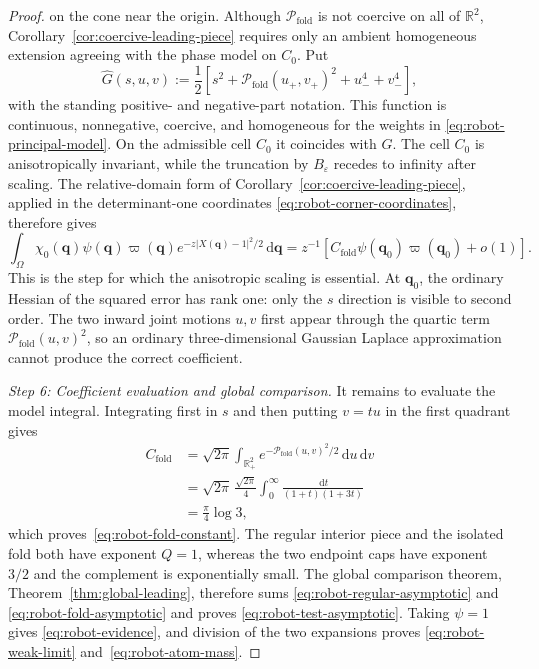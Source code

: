 \documentclass[11pt]{amsart}
\numberwithin{equation}{section}
\theoremstyle{definition}
\theoremstyle{remark}
\newcommand{\R}{\mathbb{R}}
\newcommand{\dd}{\,\mathrm{d}}
\newcommand{\eps}{\varepsilon}
\begin{document}
\begin{proof}
on the cone near the origin.  Although $\mathcal P_{\mathrm{fold}}$ is not coercive on all of $\R^2$,
Corollary~\ref{cor:coercive-leading-piece} requires only an ambient homogeneous
extension agreeing with the phase model on $C_0$.  Put
\begin{equation}\label{eq:robot-extended-model}
 \widehat G(s,u,v):=
 \frac12\left[
 s^2+\mathcal P_{\mathrm{fold}}(u_+,v_+)^2+u_-^4+v_-^4
 \right],
\end{equation}
with the standing positive- and negative-part notation.  This function is continuous,
nonnegative, coercive, and homogeneous for the weights in
\eqref{eq:robot-principal-model}.  On the admissible cell $C_0$ it coincides
with $G$.  The cell $C_0$ is anisotropically invariant, while the truncation by
$B_\eps$ recedes to infinity after scaling.  The relative-domain form of
Corollary~\ref{cor:coercive-leading-piece}, applied in the determinant-one
coordinates
\eqref{eq:robot-corner-coordinates}, therefore gives
\begin{equation}\label{eq:robot-fold-asymptotic}
 \int_\Omega\chi_0(\bm q)\psi(\bm q)\varpi(\bm q)
 e^{-z|X(\bm q)-1|^2/2}\dd \bm q
 =z^{-1}\left[
 C_{\mathrm{fold}}\psi(\bm q_0)\varpi(\bm q_0)+o(1)
 \right].
\end{equation}
This is the step for which the anisotropic scaling is essential.  At
$\bm q_0$, the ordinary Hessian of the squared error has rank one: only the $s$
direction is visible to second order.  The two inward joint motions $u,v$
first appear through the quartic term $\mathcal P_{\mathrm{fold}}(u,v)^2$, so an ordinary
three-dimensional Gaussian Laplace approximation cannot produce the correct
coefficient.

\smallskip
\noindent\emph{Step 6: Coefficient evaluation and global comparison.}
It remains to evaluate the model integral.  Integrating first in $s$ and then
putting $v=tu$ in the first quadrant gives
\begin{align*}
 C_{\mathrm{fold}}
 &=\sqrt{2\pi}\int_{\R_+^2}
 e^{-\mathcal P_{\mathrm{fold}}(u,v)^2/2}\dd u\dd v\\
 &=\sqrt{2\pi}\,\frac{\sqrt{2\pi}}4
 \int_0^\infty\frac{\dd t}{(1+t)(1+3t)}\\
 &=\frac{\pi}{4}\log3,
\end{align*}
which proves~\eqref{eq:robot-fold-constant}.  The regular interior piece
and the isolated fold both have exponent $Q=1$, whereas the two endpoint caps
have exponent $3/2$ and the complement is exponentially small.  The global
comparison theorem, Theorem~\ref{thm:global-leading}, therefore sums
\eqref{eq:robot-regular-asymptotic} and
\eqref{eq:robot-fold-asymptotic} and proves
\eqref{eq:robot-test-asymptotic}.  Taking $\psi=1$ gives
\eqref{eq:robot-evidence}, and division of the two expansions proves
\eqref{eq:robot-weak-limit} and~\eqref{eq:robot-atom-mass}.


\end{proof}
\end{document}
